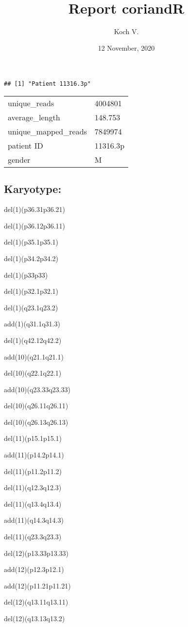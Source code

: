 \documentclass[]{article}
\title{Report coriandR}
\author{Koch V.}
\date{12 November, 2020}
\begin{document}
\maketitle

\begin{verbatim}
## [1] "Patient 11316.3p"
\end{verbatim}

\begin{longtable}[]{@{}ll@{}}
\toprule
\endhead
unique\_reads & 4004801\tabularnewline
average\_length & 148.753\tabularnewline
unique\_mapped\_reads & 7849974\tabularnewline
patient ID & 11316.3p\tabularnewline
gender & M\tabularnewline
\bottomrule
\end{longtable}

\hypertarget{karyotype}{%
\subsection{Karyotype:}\label{karyotype}}

del(1)(p36.31p36.21)

del(1)(p36.12p36.11)

del(1)(p35.1p35.1)

del(1)(p34.2p34.2)

del(1)(p33p33)

del(1)(p32.1p32.1)

del(1)(q23.1q23.2)

add(1)(q31.1q31.3)

del(1)(q42.12q42.2)

add(10)(q21.1q21.1)

del(10)(q22.1q22.1)

add(10)(q23.33q23.33)

del(10)(q26.11q26.11)

del(10)(q26.13q26.13)

del(11)(p15.1p15.1)

add(11)(p14.2p14.1)

del(11)(p11.2p11.2)

del(11)(q12.3q12.3)

del(11)(q13.4q13.4)

add(11)(q14.3q14.3)

del(11)(q23.3q23.3)

del(12)(p13.33p13.33)

add(12)(p12.3p12.1)

add(12)(p11.21p11.21)

del(12)(q13.11q13.11)

del(12)(q13.13q13.2)
\end{document}
